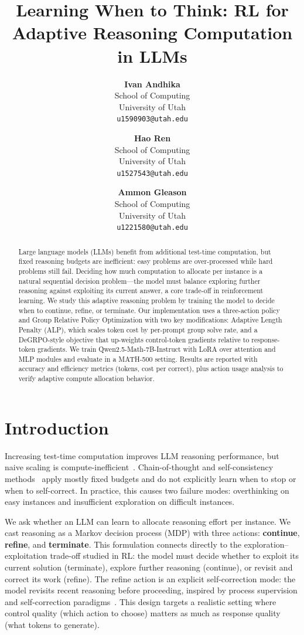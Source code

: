 \documentclass{article}
\title{Learning When to Think: RL for Adaptive Reasoning Computation in LLMs}
\author{%
  \textbf{Ivan Andhika} \\
  School of Computing\\
  University of Utah\\
  \texttt{u1590903@utah.edu} \\
  \and
  \textbf{Hao Ren} \\
  School of Computing\\
  University of Utah\\
  \texttt{u1527543@utah.edu} \\
  \and
  \textbf{Ammon Gleason} \\
  School of Computing\\
  University of Utah\\
  \texttt{u1221580@utah.edu} \\
}
\begin{document}
\maketitle

\begin{abstract}
Large language models (LLMs) benefit from additional test-time computation, but fixed reasoning budgets are inefficient: easy problems are over-processed while hard problems still fail. Deciding how much computation to allocate per instance is a natural sequential decision problem---the model must balance exploring further reasoning against exploiting its current answer, a core trade-off in reinforcement learning. We study this adaptive reasoning problem by training the model to decide when to continue, refine, or terminate. Our implementation uses a three-action policy and Group Relative Policy Optimization with two key modifications: Adaptive Length Penalty (ALP), which scales token cost by per-prompt group solve rate, and a DeGRPO-style objective that up-weights control-token gradients relative to response-token gradients. We train Qwen2.5-Math-7B-Instruct with LoRA over attention and MLP modules and evaluate in a MATH-500 setting. Results are reported with accuracy and efficiency metrics (tokens, cost per correct), plus action usage analysis to verify adaptive compute allocation behavior.
\end{abstract}

\section{Introduction}

Increasing test-time computation improves LLM reasoning performance, but naive scaling is compute-inefficient~\citep{snell2024scaling}. Chain-of-thought and self-consistency methods~\citep{wei2022chainofthought,wang2023selfconsistency} apply mostly fixed budgets and do not explicitly learn when to stop or when to self-correct. In practice, this causes two failure modes: overthinking on easy instances and insufficient exploration on difficult instances.

We ask whether an LLM can learn to allocate reasoning effort per instance. We cast reasoning as a Markov decision process (MDP) with three actions: \textbf{continue}, \textbf{refine}, and \textbf{terminate}. This formulation connects directly to the exploration--exploitation trade-off studied in RL: the model must decide whether to exploit its current solution (terminate), explore further reasoning (continue), or revisit and correct its work (refine). The refine action is an explicit self-correction mode: the model revisits recent reasoning before proceeding, inspired by process supervision and self-correction paradigms~\citep{lightman2023lets,kumar2024score,uesato2022process}. This design targets a realistic setting where control quality (which action to choose) matters as much as response quality (what tokens to generate).
\end{document}
